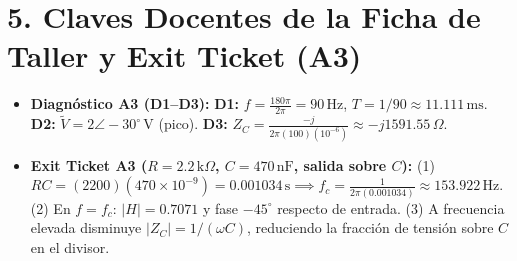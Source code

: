 \documentclass[11pt, a4paper]{article}
\newcommand{\phasor}[1]{\widetilde{#1}}
\begin{document}
\section*{5. Claves Docentes de la Ficha de Taller y Exit Ticket (A3)}
\begin{itemize}\setlength\itemsep{0.12cm}
    \item \textbf{Diagnóstico A3 (D1--D3):} \textbf{D1:} $f = \frac{180\pi}{2\pi} = 90\,\text{Hz}$, $T = 1/90 \approx 11.111\,\text{ms}$. \textbf{D2:} $\phasor{V} = 2\angle -30^\circ\,\text{V}$ (pico). \textbf{D3:} $Z_C = \frac{-j}{2\pi(100)(10^{-6})} \approx -j1591.55\,\Omega$.
    \item \textbf{Exit Ticket A3 ($R = 2.2\,\text{k}\Omega$, $C = 470\,\text{nF}$, salida sobre $C$):} (1) $RC = (2200)(470\times 10^{-9}) = 0.001034\,\text{s} \implies f_c = \frac{1}{2\pi(0.001034)} \approx 153.922\,\text{Hz}$. (2) En $f = f_c$: $|H| = 0.7071$ y fase $-45^\circ$ respecto de entrada. (3) A frecuencia elevada disminuye $|Z_C| = 1/(\omega C)$, reduciendo la fracción de tensión sobre $C$ en el divisor.
\end{itemize}
\end{document}
